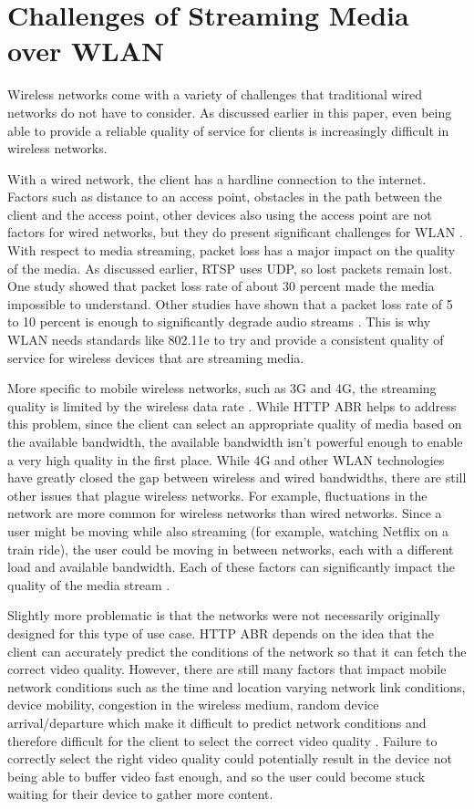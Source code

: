 \documentclass[12pt]{article}
\begin{document}
\section{Challenges of Streaming Media over WLAN}
Wireless networks come with a variety of challenges that traditional wired networks do not have to consider.  As discussed earlier in this paper, even being able to provide a reliable quality of service for clients is increasingly difficult in wireless networks.

With a wired network, the client has a hardline connection to the internet.  Factors such as distance to an access point, obstacles in the path between the client and the access point, other devices also using the access point are not factors for wired networks, but they do present significant challenges for WLAN \cite{7146968}.  With respect to media streaming, packet loss has a major impact on the quality of the media.  As discussed earlier, RTSP uses UDP, so lost packets remain lost.  One study showed that packet loss rate of about 30 percent made the media impossible to understand.  Other studies have shown that a packet loss rate of 5 to 10 percent is enough to significantly degrade audio streams \cite{lantowlan}.  This is why WLAN needs standards like 802.11e to try and provide a consistent quality of service for wireless devices that are streaming media.

More specific to mobile wireless networks, such as 3G and 4G, the streaming quality is limited by the wireless data rate \cite{wireless_stream_challenges}.  While HTTP ABR helps to address this problem, since the client can select an appropriate quality of media based on the available bandwidth, the available bandwidth isn't powerful enough to enable a very high quality in the first place.  While 4G and other WLAN technologies have greatly closed the gap between wireless and wired bandwidths, there are still other issues that plague wireless networks.  For example, fluctuations in the network are more common for wireless networks than wired networks.  Since a user might be moving while also streaming (for example, watching Netflix on a train ride), the user could be moving in between networks, each with a different load and available bandwidth.  Each of these factors can significantly impact the quality of the media stream \cite{wireless_stream_challenges}.

Slightly more problematic is that the networks were not necessarily originally designed for this type of use case.  HTTP ABR depends on the idea that the client can accurately predict the conditions of the network so that it can fetch the correct video quality.  However, there are still many factors that impact mobile network conditions such as the time and location varying network link conditions, device mobility, congestion in the wireless medium, random device arrival/departure which make it difficult to predict network conditions and therefore difficult for the client to select the correct video quality \cite{10287427420150501}.  Failure to correctly select the right video quality could potentially result in the device not being able to buffer video fast enough, and so the user could become stuck waiting for their device to gather more content.
\end{document}
